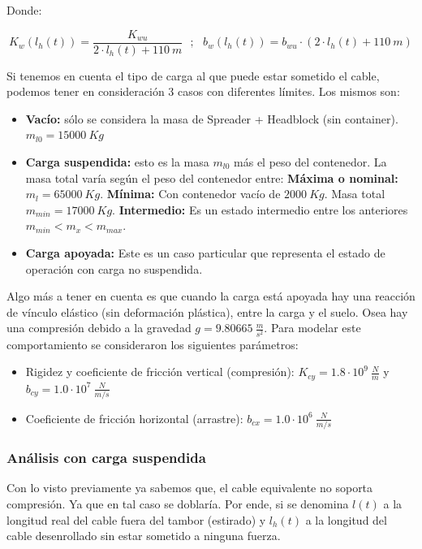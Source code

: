 \documentclass[11pt]{article}
\begin{document}
Donde:

\begin{equation}
	\label{eq:sistema_izaje_fuerza_cable_params}
	K_{w}\left ( l_{h}(t) \right )=\frac{K_{wu}}{2\cdot l_{h}(t)+110\ m}\ \ \ ;\ \ \ b_{w}\left ( l_{h}(t) \right )=b_{wu}\cdot \left ( 2\cdot l_{h}(t)+110\ m \right )
\end{equation}

Si tenemos en cuenta el tipo de carga al que puede estar sometido el cable, podemos tener en consideración 3 casos con diferentes límites. Los mismos son:

\begin{itemize}
	\item \textbf{Vacío:} sólo se considera la masa de Spreader + Headblock (sin container). $m_{l0}=15000\ Kg$
	\item \textbf{Carga suspendida:} esto es la masa $m_{l0}$ más el peso del contenedor. La masa total varía según el peso del contenedor entre:
		\subitem \textbf{Máxima o nominal:} $m_{l}=65000\ Kg$.
		\subitem \textbf{Mínima:} Con contenedor vacío de $2000\ Kg$. Masa total $m_{min}=17000\ Kg$.
		\subitem \textbf{Intermedio:} Es un estado intermedio entre los anteriores $m_{min}<m_{x}<m_{max}$.
	\item \textbf{Carga apoyada:} Este es un caso particular que representa el estado de operación con carga no suspendida.
	
\end{itemize}

Algo más a tener en cuenta es que cuando la carga está apoyada hay una reacción de vínculo elástico (sin deformación plástica), entre la carga y el suelo. Osea hay una compresión debido a la gravedad $g=9.80665\ \frac{m}{s^{2}}$. Para modelar este comportamiento se consideraron los siguientes parámetros:
\begin{itemize}
	\item Rigidez y coeficiente de fricción vertical (compresión): $K_{cy}=1.8\cdot 10^{9}\ \frac{N}{m}$ y $b_{cy}=1.0\cdot 10^{7}\ \frac{N}{m/s}$
	\item Coeficiente de fricción horizontal (arrastre): $b_{cx}=1.0\cdot 10^{6}\ \frac{N}{m/s}$
\end{itemize}

\subsubsection{Análisis con carga suspendida}

Con lo visto previamente ya sabemos que, el cable equivalente no soporta compresión. Ya que en tal caso se doblaría. Por ende, si se denomina $l(t)$ a la longitud real del cable fuera del tambor (estirado) y $l_{h}(t)$ a la longitud del cable desenrollado sin estar sometido a ninguna fuerza.
\end{document}
